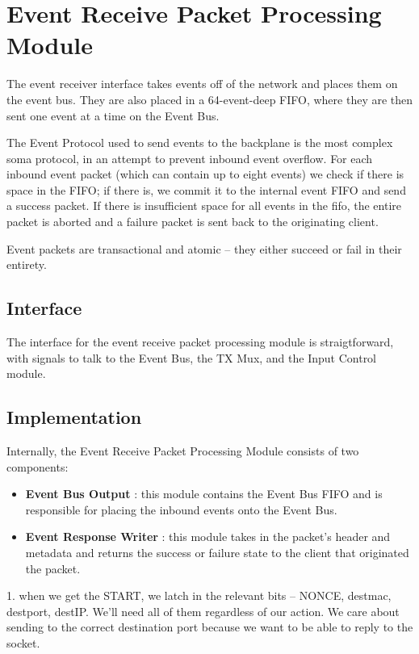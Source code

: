\section{Event Receive Packet Processing Module}

The event receiver interface takes events off of the network and
places them on the event bus. They are also placed in a 64-event-deep
FIFO, where they are then sent one event at a time on the Event Bus.

The Event Protocol used to send events to the backplane is the most
complex soma protocol, in an attempt to prevent inbound event
overflow. For each inbound event packet (which can contain up to eight
events) we check if there is space in the FIFO; if there is, we commit
it to the internal event FIFO and send a success packet. If there is
insufficient space for all events in the fifo, the entire packet is
aborted and a failure packet is sent back to the originating client.

Event packets are transactional and atomic -- they either succeed or
fail in their entirety.

\subsection{Interface}
The interface for the event receive packet processing module is
straigtforward, with signals to talk to the Event Bus, the TX Mux, and
the Input Control module.

\subsection{Implementation}

Internally, the Event Receive Packet Processing Module consists of two components:
\begin{itemize}
\item \textbf{Event Bus Output} : this module contains the Event Bus FIFO and is responsible for placing the inbound events onto the Event Bus. 
\item \textbf{Event Response Writer} : this module takes in the packet's header and metadata and returns the success or failure state to the client that originated the packet. 
\end{itemize}

1. when we get the START, we latch in the relevant bits -- NONCE,
   destmac, destport, destIP. We'll need all of them regardless of our
   action. We care about sending to the correct destination port
   because we want to be able to reply to the socket.


